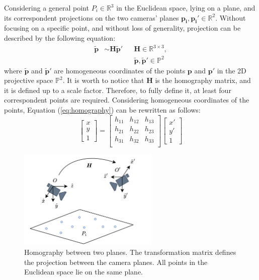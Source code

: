 Considering a general point $P_i \in \mathbb{R}^{3}$ in the Euclidean space, 
lying on a plane, and its correspondent projections on the two cameras' planes
$\boldsymbol{p_i}, \boldsymbol{p_i'} \in \mathbb{R}^{2}$.
Without focusing on a specific point, and without loss of generality, projection 
can be described by the following equation:
\begin{align}
    \boldsymbol{\tilde{p}} &\sim \boldsymbol{H} \boldsymbol{\tilde{p}'} && \boldsymbol{H} \in \mathbb{R}^{3 \times 3}, 
    \label{eq:homography}\\
    & && \boldsymbol{\tilde{p}}, \boldsymbol{\tilde{p}'} \in \mathbb{P}^{2}\nonumber
\end{align}
where $\boldsymbol{\tilde{p}}$ and $\boldsymbol{\tilde{p}'}$ are homogeneous 
coordinates of the points $\boldsymbol{p}$ and $\boldsymbol{p'}$ in the 2D
projective space $\mathbb{P}^{2}$. It is worth to notice that $\boldsymbol{H}$ 
is the homography matrix, and it is defined up to a scale factor. Therefore, to 
fully define it, at least four correspondent points are required.
Considering homogeneous coordinates of the points, Equation (\ref{eq:homography}) 
can be rewritten as follows:
\begin{equation}
    \begin{bmatrix}
        x \\
        y \\
        1
    \end{bmatrix}
    =
    \begin{bmatrix}
        h_{11} & h_{12} & h_{13} \\
        h_{21} & h_{22} & h_{23} \\
        h_{31} & h_{32} & h_{33} \\
    \end{bmatrix}
    \begin{bmatrix}
        x' \\
        y' \\
        1
    \end{bmatrix}
    \label{eq:homography_matrix}
\end{equation}
\begin{figure}
    \centering
    \includegraphics[width=0.6\textwidth]{images/dreyeve/homography.png}
    \vspace{0.2cm}
    \caption[Homography scheme.]
    {Homography between two planes. The transformation matrix defines the 
    projection between the camera planes. All points in the Euclidean space 
    lie on the same plane.}
    \label{fig:homography_scheme}
\end{figure}

